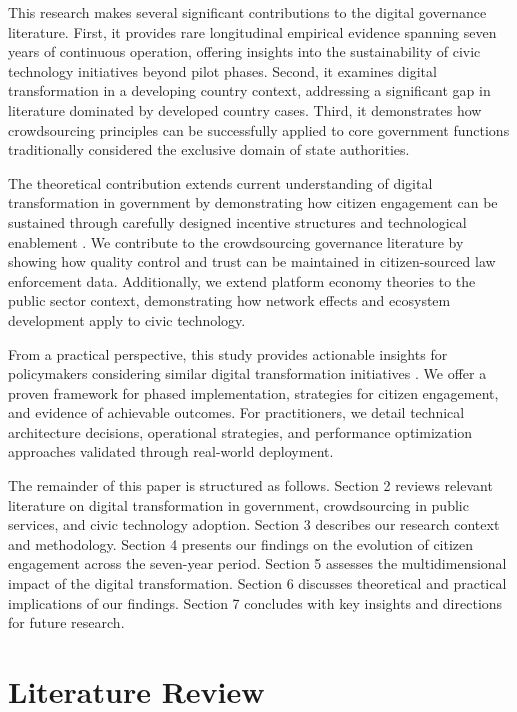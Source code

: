 \documentclass[pdflatex,sn-mathphys-num]{sn-jnl}%
\theoremstyle{thmstyleone}%
\theoremstyle{thmstyletwo}%
\theoremstyle{thmstylethree}%
\begin{document}
This research makes several significant contributions to the digital governance literature. First, it provides rare longitudinal empirical evidence spanning seven years of continuous operation, offering insights into the sustainability of civic technology initiatives beyond pilot phases. Second, it examines digital transformation in a developing country context, addressing a significant gap in literature dominated by developed country cases. Third, it demonstrates how crowdsourcing principles can be successfully applied to core government functions traditionally considered the exclusive domain of state authorities.

The theoretical contribution extends current understanding of digital transformation in government by demonstrating how citizen engagement can be sustained through carefully designed incentive structures and technological enablement \cite{rose2015stakeholder}. We contribute to the crowdsourcing governance literature by showing how quality control and trust can be maintained in citizen-sourced law enforcement data. Additionally, we extend platform economy theories to the public sector context, demonstrating how network effects and ecosystem development apply to civic technology.

From a practical perspective, this study provides actionable insights for policymakers considering similar digital transformation initiatives \cite{moon2002evolution,mergel2013social}. We offer a proven framework for phased implementation, strategies for citizen engagement, and evidence of achievable outcomes. For practitioners, we detail technical architecture decisions, operational strategies, and performance optimization approaches validated through real-world deployment.

The remainder of this paper is structured as follows. Section 2 reviews relevant literature on digital transformation in government, crowdsourcing in public services, and civic technology adoption. Section 3 describes our research context and methodology. Section 4 presents our findings on the evolution of citizen engagement across the seven-year period. Section 5 assesses the multidimensional impact of the digital transformation. Section 6 discusses theoretical and practical implications of our findings. Section 7 concludes with key insights and directions for future research.

\section{Literature Review}\label{sec2}
\end{document}
